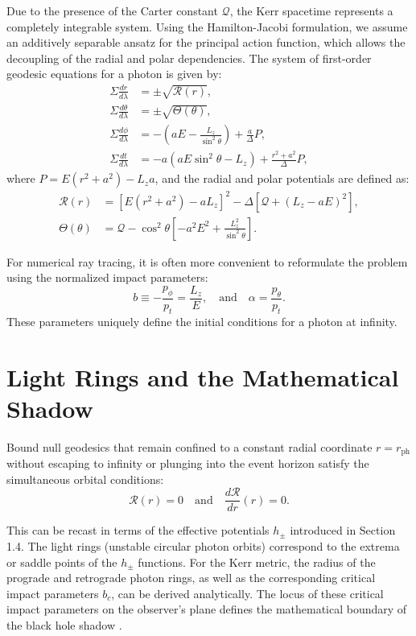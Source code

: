 \documentclass[11pt]{book}
\begin{document}
Due to the presence of the Carter constant $\mathcal{Q}$, the Kerr spacetime represents a completely integrable system. Using the Hamilton-Jacobi formulation, we assume an additively separable ansatz for the principal action function, which allows the decoupling of the radial and polar dependencies. The system of first-order geodesic equations for a photon is given by:
\begin{align}
    \Sigma \frac{dr}{d\lambda} &= \pm \sqrt{\mathcal{R}(r)}, \\
    \Sigma \frac{d\theta}{d\lambda} &= \pm \sqrt{\Theta(\theta)}, \\
    \Sigma \frac{d\phi}{d\lambda} &= -\left(aE - \frac{L_z}{\sin^2\theta}\right) + \frac{a}{\Delta} P, \\
    \Sigma \frac{dt}{d\lambda} &= -a\left(aE\sin^2\theta - L_z\right) + \frac{r^2 + a^2}{\Delta} P,
\end{align}
where $P = E(r^2 + a^2) - L_z a$, and the radial and polar potentials are defined as:
\begin{align}
    \mathcal{R}(r) &= \left[ E(r^2 + a^2) - a L_z \right]^2 - \Delta \left[ \mathcal{Q} + (L_z - a E)^2 \right], \\
    \Theta(\theta) &= \mathcal{Q} - \cos^2\theta \left[ - a^2 E^2 + \frac{L_z^2}{\sin^2\theta} \right].
\end{align}

For numerical ray tracing, it is often more convenient to reformulate the problem using the normalized impact parameters:
\begin{equation}
    b \equiv -\frac{p_\phi}{p_t} = \frac{L_z}{E}, \quad \text{and} \quad \alpha = \frac{p_\theta}{p_t}.
\end{equation}
These parameters uniquely define the initial conditions for a photon at infinity.

\section{Light Rings and the Mathematical Shadow}

Bound null geodesics that remain confined to a constant radial coordinate $r = r_{\text{ph}}$ without escaping to infinity or plunging into the event horizon satisfy the simultaneous orbital conditions:
\begin{equation}
    \mathcal{R}(r) = 0 \quad \text{and} \quad \frac{d\mathcal{R}}{dr}(r) = 0.
\end{equation}

This can be recast in terms of the effective potentials \(h_{\pm}\) introduced in Section 1.4. The light rings (unstable circular photon orbits) correspond to the extrema or saddle points of the \(h_{\pm}\) functions. For the Kerr metric, the radius of the prograde and retrograde photon rings, as well as the corresponding critical impact parameters \(b_c\), can be derived analytically. The locus of these critical impact parameters on the observer's plane defines the mathematical boundary of the black hole shadow \cite{Synge1966, Falcke2000, Gralla2019}.
\end{document}
